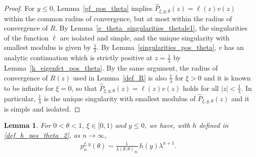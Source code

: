 \documentclass[10pt,a4paper]{amsart}
\newcommand{\1}{\mathds{1}}
\newtheorem{Lemma}[definition]{Lemma}
\begin{document}
\begin{proof}
    For $y\le 0$, Lemma~\ref{gf_pos_theta} implies $\hat{P}_{\xi,y,\theta}(z)=\ell(z)v(z)$ within the common radius of convergence, but at most within the radius of convergence of $R$. By Lemma~\ref{e_theta_singularities_thetale1}, the singularities of the function $\ell$ are isolated and simple, and the unique singularity with smallest modulus is given by $\frac{1}{\lambda}$. By Lemma~\ref{singularities_pos_theta}, $v$ has an analytic continuation which is strictly positive at $z=\frac{1}{\lambda}$ by Lemma~\ref{h_eigenfct_pos_theta}. By the same argument, the radius of convergence of $R(z)$ used in Lemma~\ref{def_R} is also $\frac{1}{\lambda}$ for $\xi>0$ and it is known to be infinite for $\xi=0$, so that $\hat{P}_{\xi,y,\theta}(z)=\ell(z)v(z)$ holds for all $|z|<\frac{1}{\lambda}$. In particular, $\frac{1}{\lambda}$ is the unique singularity with smallest modulus of $\hat{P}_{\xi,y,\theta}(z)$ and it is simple and isolated.
\end{proof}
\begin{Lemma}\label{asymptotic_pos_theta_neg_y}
  For $0<\theta<1$, $\xi\in[0,1)$ and $y\le 0$, we have, with $h$ defined in \eqref{def_h_pos_theta_2}, as $n\to\infty$,
  \begin{align*}
       p_n^{\xi,y}(\theta)\sim \frac{1}{\lambda(\theta;\theta)_\infty}\,h(y)\lambda^{n+1}.
  \end{align*}
\end{Lemma}
\end{document}
